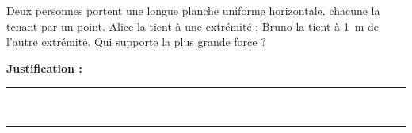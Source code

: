 Deux personnes portent une longue planche uniforme horizontale, chacune la tenant par un point. Alice la tient à une extrémité ; Bruno la tient à \qty{1}{m} de l'autre extrémité. Qui supporte la plus grande force ?

\choices

\noindent\textbf{Justification :} \hrulefill \\[2.5ex]
\rule{\linewidth}{0.4pt} \\[2.5ex]
\rule{\linewidth}{0.4pt}
\vfill
